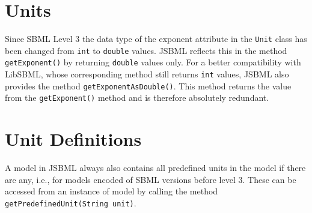 \documentclass[
  letterpaper,
  11pt,
  headsepline,
  pointlessnumbers,
  tablecaptionabove,
  headinclude,
  appendixprefix,
  idxtotoc,
  bibtotoc
]{scrartcl}
\begin{document}
\section{Units}

Since SBML Level 3 the data type of the exponent attribute in the \verb!Unit! class
has been changed from \verb!int! to \verb!double! values. JSBML reflects this in
the method \verb!getExponent()! by returning \verb!double! values only. For a
better compatibility with LibSBML, whose corresponding method still returns 
\verb!int! values, JSBML also provides the method \verb!getExponentAsDouble()!.
This method returns the value from the \verb!getExponent()! method and is
therefore absolutely redundant.

\section{Unit Definitions}

A model in JSBML always also contains all predefined units in the model
if there are any, i.e., for models encoded of SBML versions before level
3. These can be accessed from an instance of model by calling the method
\verb!getPredefinedUnit(String unit)!.


% 
% 
\end{document}
